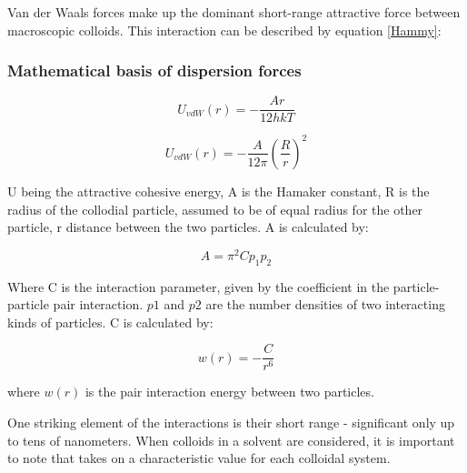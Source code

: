 Van der Waals forces make up the dominant short-range attractive force between macroscopic colloids.\cite{colloid_review1}%
This interaction can be described by equation \ref{Hammy}:  

\subsubsection{Mathematical basis of dispersion forces} %

\begin{equation} %
U_{vdW} (r) = - \frac{A r}{12hkT}
\label{Hammy}
\end{equation}

\begin{equation}
U_{vdW} (r) = - \frac{A}{12\pi} \left( \frac{R}{r}\right)^2
\label{VDWeqn}
\end{equation}

U being the attractive cohesive energy, A is the Hamaker constant, R is the radius of the collodial particle, assumed to be of equal radius for the other particle, r distance between the two particles.\cite{?} A is calculated by:

\begin{equation} %
A = \pi^2 C p_1 p_2
\end{equation}

Where C is the interaction parameter, given by the coefficient in the particle-particle pair interaction. $p1$ and $p2$ are the number densities of two interacting kinds of particles.\cite{?} C is calculated by:

\begin{equation}
w(r) = - \frac{C}{r^6}
\end{equation}

where $w(r)$ is the pair interaction energy between two particles.

One striking element of the %
interactions %
is their short range - significant only %
up to tens of nanometers. When colloids in a solvent are considered, it is important to note that %
takes on a characteristic value for each colloidal system.\cite{?} %


